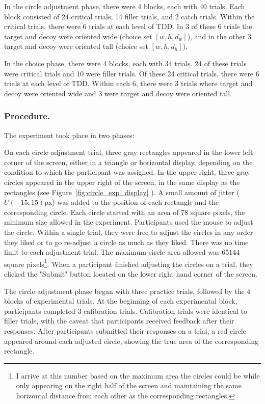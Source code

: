In the circle adjustment phase, there were 4 blocks, each with 40 trials. Each block consisted of 24 critical trials, 14 filler trials, and 2 catch trials. Within the critical trials, there were 6 trials at each level of TDD. In 3 of these 6 trials the target and decoy were oriented wide (choice set $[w,h,d_{w}]$), and in the other 3 target and decoy were oriented tall (choice set $[w,h,d_{h}]$). 

In the choice phase, there were 4 blocks, each with 34 trials. 24 of these trials were critical trials and 10 were filler trials. Of these 24 critical trials, there were 6 trials at each level of TDD. Within each 6, there were 3 trials where target and decoy were oriented wide and 3 were target and decoy were oriented tall. 

\subsubsection{Procedure.}

The experiment took place in two phases: 

On each circle adjustment trial, three gray rectangles appeared in the lower left corner of the screen, either in a triangle or horizontal display, depending on the condition to which the participant was assigned. In the upper right, three gray circles appeared in the upper right of the screen, in the same display as the rectangles (see Figure~\ref{fig:circle_exp_display} ). A small amount of jitter ($U(-15,15)\text{px}$) was added to the position of each rectangle and the corresponding circle. Each circle started with an area of 78 square pixels, the minimum size allowed in the experiment. Participants used the mouse to adjust the circle. Within a single trial, they were free to adjust the circles in any order they liked or to go re-adjust a circle as much as they liked. There was no time limit to each adjustment trial. The maximum circle area allowed was 65144 square pixels\footnote{I arrive at this number based on the maximum area the circles could be while only appearing on the right half of the screen and maintaining the same horizontal distance from each other as the corresponding rectangles.}. When a participant finished adjusting the circles on a trial, they clicked the "Submit" button located on the lower right hand corner of the screen. 

The circle adjustment phase began with three practice trials, followed by the 4 blocks of experimental trials. At the beginning of each experimental block, participants completed 3 calibration trials. Calibration trials were identical to filler trials, with the caveat that participants received feedback after their responses. After participants submitted their responses on a trial, a red circle appeared around each adjusted circle, showing the true area of the corresponding rectangle. 

